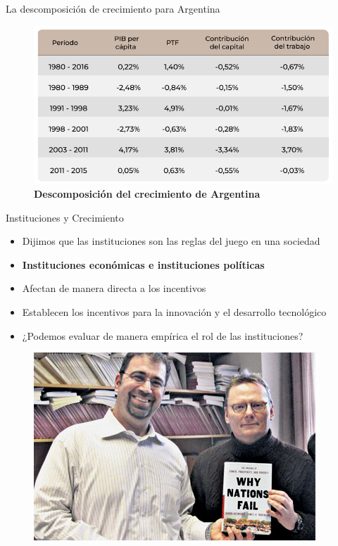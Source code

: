 \documentclass{beamer}
\begin{document}
\begin{frame}{La descomposición de crecimiento para Argentina}
    \begin{figure} [H]   
        \includegraphics[scale=0.55]{../Figures/C30.8.png}
        \caption{\textbf{Descomposición del crecimiento de Argentina}}
    \end{figure}
\end{frame}

\begin{frame}{Instituciones y Crecimiento}
    \begin{itemize}
        \item Dijimos que las instituciones son las reglas del juego en una sociedad
        \item \textbf{Instituciones económicas e instituciones políticas}
        \item Afectan de manera directa a los incentivos
        \item Establecen los incentivos para la innovación y el desarrollo tecnológico
        \item ¿Podemos evaluar de manera empírica el rol de las instituciones?
    \end{itemize}
    
    \begin{figure}[H]
        \includegraphics[scale=0.5]{../Figures/Acemoglurobinson.png}
    \end{figure}
\end{frame}
\end{document}
